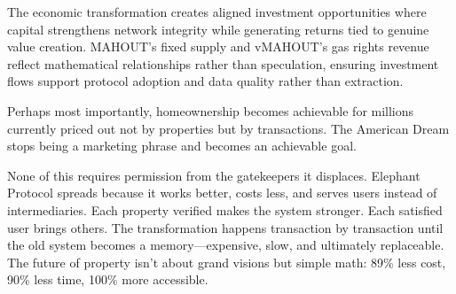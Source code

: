 The economic transformation creates aligned investment opportunities where capital strengthens network integrity while generating returns tied to genuine value creation. MAHOUT's fixed supply and vMAHOUT's gas rights revenue reflect mathematical relationships rather than speculation, ensuring investment flows support protocol adoption and data quality rather than extraction.

Perhaps most importantly, homeownership becomes achievable for millions currently priced out not by properties but by transactions. The American Dream stops being a marketing phrase and becomes an achievable goal.

None of this requires permission from the gatekeepers it displaces. Elephant Protocol spreads because it works better, costs less, and serves users instead of intermediaries. Each property verified makes the system stronger. Each satisfied user brings others. The transformation happens transaction by transaction until the old system becomes a memory---expensive, slow, and ultimately replaceable. The future of property isn't about grand visions but simple math: 89\% less cost, 90\% less time, 100\% more accessible.